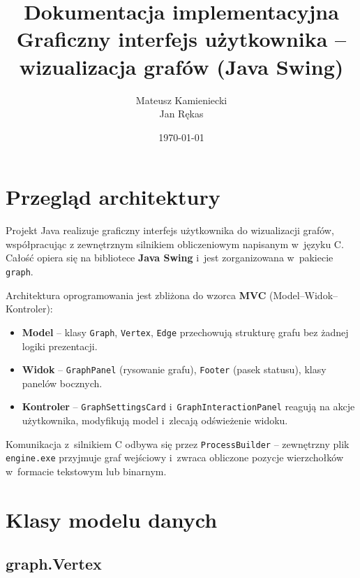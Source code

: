 \documentclass[12pt]{article}
\title{Dokumentacja implementacyjna \\ \large Graficzny interfejs użytkownika -- wizualizacja grafów (Java Swing)}
\author{Mateusz Kamieniecki \\ Jan Rękas}
\date{\today}
\begin{document}
\maketitle
\tableofcontents
\newpage

\section{Przegląd architektury}

Projekt Java realizuje graficzny interfejs użytkownika do wizualizacji grafów,
współpracując z zewnętrznym silnikiem obliczeniowym napisanym w~języku C.
Całość opiera się na bibliotece \textbf{Java Swing} i~jest zorganizowana
w~pakiecie \texttt{graph}.

Architektura oprogramowania jest zbliżona do wzorca \textbf{MVC}
(Model--Widok--Kontroler):
\begin{itemize}
    \item \textbf{Model} -- klasy \texttt{Graph}, \texttt{Vertex}, \texttt{Edge}
          przechowują strukturę grafu bez żadnej logiki prezentacji.
    \item \textbf{Widok} -- \texttt{GraphPanel} (rysowanie grafu),
          \texttt{Footer} (pasek statusu), klasy panelów bocznych.
    \item \textbf{Kontroler} -- \texttt{GraphSettingsCard} i~\texttt{GraphInteractionPanel}
          reagują na akcje użytkownika, modyfikują model i~zlecają odświeżenie widoku.
\end{itemize}

Komunikacja z~silnikiem C odbywa się przez \texttt{ProcessBuilder} --
zewnętrzny plik \texttt{engine.exe} przyjmuje graf wejściowy i~zwraca
obliczone pozycje wierzchołków w~formacie tekstowym lub binarnym.

\section{Klasy modelu danych}

\subsection{graph.Vertex}
\end{document}
